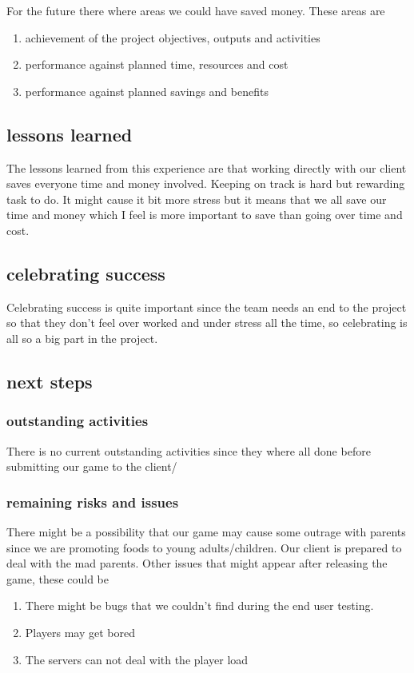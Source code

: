 \documentclass{article}
\begin{document}
For the future there where areas we could have saved money. These areas are
\begin{enumerate}
	\item achievement of the project objectives, outputs and activities
	\item performance against planned time, resources and cost
	\item performance against planned savings and benefits
\end{enumerate}

\subsection{lessons learned}
The lessons learned from this experience are that working directly with our client saves everyone time and money involved. Keeping on track is hard but rewarding task to do. It might cause it bit more stress  but it means that we all save our time and money which I feel is more important to save than going over time and cost.

\subsection{celebrating success}
Celebrating success is quite important since the team needs an end to the project so that they don't feel over worked and under stress all the time, so celebrating is all so a big part in the project.


\subsection{next steps}
\subsubsection{outstanding activities}
There is no current outstanding activities since they where all done before submitting our game to the client/

\subsubsection{remaining risks and issues}
There might be a possibility that our game may cause some outrage with parents since we are promoting foods to young adults/children. Our client is prepared to deal with the mad parents. Other issues that might appear after releasing the game, these could be
\begin{enumerate}
	\item There might be bugs that we couldn't find during the end user testing. 
	\item Players may get bored
	\item The servers can not deal with the player load
\end{enumerate}
\end{document}
